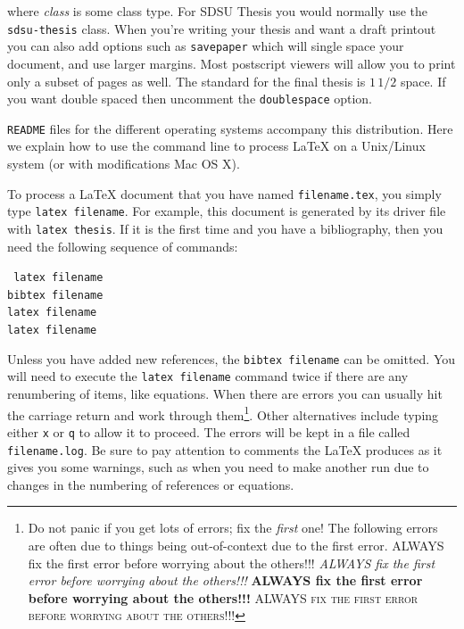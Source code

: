 \noindent
where \emph{class} is some class type.  For SDSU Thesis you would
normally use the \texttt{sdsu-thesis} class.  When you're writing your
thesis and want a draft printout you can also add options such as
\texttt{savepaper} which will single space your document, and use
larger margins.  Most postscript viewers will allow you to print only
a subset of pages as well.  The standard for the final thesis is $1
\,1/2$ space.  If you want double spaced then uncomment the
\texttt{doublespace} option.

\verb+README+ files for the different operating systems accompany this
distribution.  Here we explain how to use the command line to process
\LaTeX{} on a Unix/Linux system (or with modifications Mac OS X).

To process a \LaTeX{} document that you have named
\texttt{filename.tex}, you simply type \texttt{latex filename}. For
example, this document is generated by its driver file with
\texttt{latex thesis}. If it is the first time and you have a
bibliography, then you need the following sequence of commands:
\vspace{.15in}

\noindent\texttt{%
  \ssp %
  \hspace*{5em}latex filename\\  
  \hspace*{5em}bibtex filename\\
  \hspace*{5em}latex filename\\
  \hspace*{5em}latex filename\\
}
\vspace{.15in}

\noindent
Unless you have added new references, the \texttt{bibtex filename} can
be omitted. You will need to execute the \texttt{latex filename}
command twice if there are any renumbering of items, like
equations. When there are errors you can usually hit the carriage
return and work through them\footnote{Do not panic if you get lots of
  errors; fix the \emph{first} one!  The following errors are often
  due to things being out-of-context due to the first error. ALWAYS
  fix the first error before worrying about the others!!!
  \emph{ALWAYS fix the first error before worrying about the
    others!!!}  \textbf{ALWAYS fix the first error before worrying
    about the others!!!} \textsc{ALWAYS fix the first error before
    worrying about the others!!!}}.  Other alternatives include typing
either \texttt{x} or \texttt{q} to allow it to proceed. The errors
will be kept in a file called \texttt{filename.log}.  Be sure to pay
attention to comments the \LaTeX{} produces as it gives you some
warnings, such as when you need to make another run due to changes in
the numbering of references or equations.

